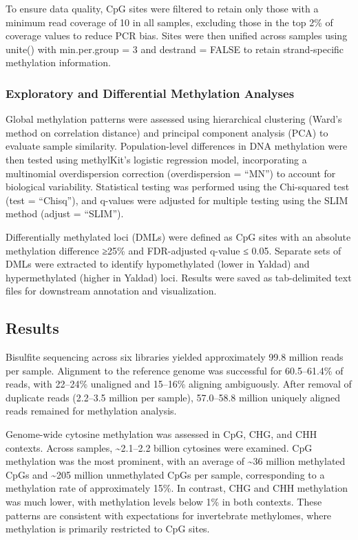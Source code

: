\documentclass[
]{agujournal2019}
\begin{document}
To ensure data quality, CpG sites were filtered to retain only those
with a minimum read coverage of 10 in all samples, excluding those in
the top 2\% of coverage values to reduce PCR bias. Sites were then
unified across samples using unite() with min.per.group = 3 and destrand
= FALSE to retain strand-specific methylation information.

\subsubsection{Exploratory and Differential Methylation
Analyses}\label{exploratory-and-differential-methylation-analyses}

Global methylation patterns were assessed using hierarchical clustering
(Ward's method on correlation distance) and principal component analysis
(PCA) to evaluate sample similarity. Population-level differences in DNA
methylation were then tested using methylKit's logistic regression
model, incorporating a multinomial overdispersion correction
(overdispersion = ``MN'') to account for biological variability.
Statistical testing was performed using the Chi-squared test (test =
``Chisq''), and q-values were adjusted for multiple testing using the
SLIM method (adjust = ``SLIM'').

Differentially methylated loci (DMLs) were defined as CpG sites with an
absolute methylation difference ≥25\% and FDR-adjusted q-value ≤ 0.05.
Separate sets of DMLs were extracted to identify hypomethylated (lower
in Yaldad) and hypermethylated (higher in Yaldad) loci. Results were
saved as tab-delimited text files for downstream annotation and
visualization.

\subsection{Results}\label{results}

Bisulfite sequencing across six libraries yielded approximately 99.8
million reads per sample. Alignment to the reference genome was
successful for 60.5--61.4\% of reads, with 22--24\% unaligned and
15--16\% aligning ambiguously. After removal of duplicate reads
(2.2--3.5 million per sample), 57.0--58.8 million uniquely aligned reads
remained for methylation analysis.

Genome-wide cytosine methylation was assessed in CpG, CHG, and CHH
contexts. Across samples, \textasciitilde2.1--2.2 billion cytosines were
examined. CpG methylation was the most prominent, with an average of
\textasciitilde36 million methylated CpGs and \textasciitilde205 million
unmethylated CpGs per sample, corresponding to a methylation rate of
approximately 15\%. In contrast, CHG and CHH methylation was much lower,
with methylation levels below 1\% in both contexts. These patterns are
consistent with expectations for invertebrate methylomes, where
methylation is primarily restricted to CpG sites.
\end{document}
